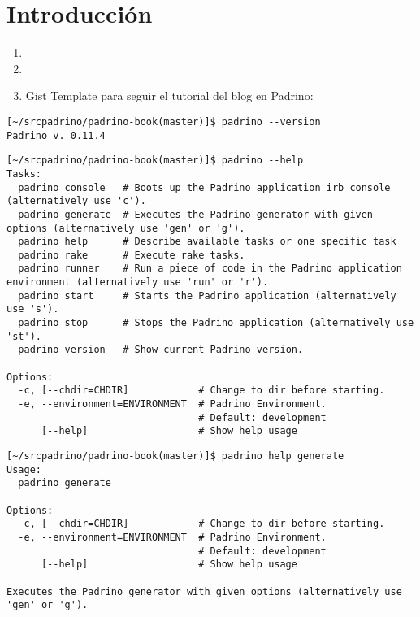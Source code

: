 \section{Introducción}
\begin{enumerate}
\item
{}
\item 
{}
\item Gist Template para seguir el tutorial del blog en Padrino:
\end{enumerate}

\begin{verbatim}
[~/srcpadrino/padrino-book(master)]$ padrino --version
Padrino v. 0.11.4
\end{verbatim}

\begin{verbatim}
[~/srcpadrino/padrino-book(master)]$ padrino --help
Tasks:
  padrino console   # Boots up the Padrino application irb console (alternatively use 'c').
  padrino generate  # Executes the Padrino generator with given options (alternatively use 'gen' or 'g').
  padrino help      # Describe available tasks or one specific task
  padrino rake      # Execute rake tasks.
  padrino runner    # Run a piece of code in the Padrino application environment (alternatively use 'run' or 'r').
  padrino start     # Starts the Padrino application (alternatively use 's').
  padrino stop      # Stops the Padrino application (alternatively use 'st').
  padrino version   # Show current Padrino version.

Options:
  -c, [--chdir=CHDIR]            # Change to dir before starting.
  -e, --environment=ENVIRONMENT  # Padrino Environment.
                                 # Default: development
      [--help]                   # Show help usage
\end{verbatim}

\begin{verbatim}
[~/srcpadrino/padrino-book(master)]$ padrino help generate
Usage:
  padrino generate

Options:
  -c, [--chdir=CHDIR]            # Change to dir before starting.
  -e, --environment=ENVIRONMENT  # Padrino Environment.
                                 # Default: development
      [--help]                   # Show help usage

Executes the Padrino generator with given options (alternatively use 'gen' or 'g').
\end{verbatim}

